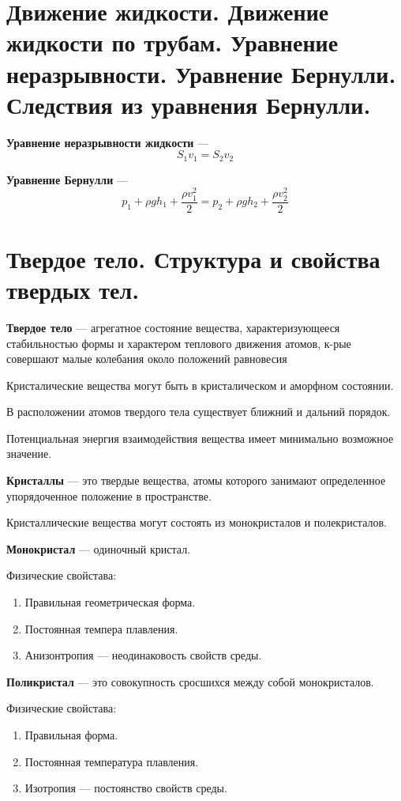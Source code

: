 \documentclass{report}
\begin{document}
\part{Движение жидкости. 
Движение жидкости по трубам. 
Уравнение неразрывности. 
Уравнение Бернулли. 
Следствия из уравнения Бернулли.}

{\bf Уравнение неразрывности жидкости} ---
$$
S_1v_1=S_2v_2
$$

{\bf Уравнение Бернулли} ---
$$
p_1+\rho gh_1+\frac{\rho v_1^2}{2}=p_2+\rho gh_2+\frac{\rho v_2^2}{2}
$$

\part{Твердое тело. 
Структура и свойства твердых тел.}

{\bf Твердое тело} ---
агрегатное состояние вещества, характеризующееся стабильностью формы и характером 
теплового движения атомов, к-рые совершают малые колебания около положений равновесия

Кристалические вещества могут быть в кристалическом и аморфном состоянии.

В расположении атомов твердого тела существует ближний и дальний порядок.

Потенциальная энергия взаимодействия вещества имеет минимально возможное значение.

{\bf Кристаллы} ---
это твердые вещества, атомы которого занимают определенное упорядоченное положение в пространстве.

Кристаллические вещества могут состоять из монокристалов и полекристалов.

{\bf Монокристал} ---
одиночный кристал.

Физические свойстава:
\begin{enumerate}
  \item Правильная геометрическая форма.
  \item Постоянная темпера плавления.
  \item Анизонтропия --- неодинаковость свойств среды. 
\end{enumerate}

{\bf Поликристал} ---
это совокупность сросшихся между собой монокристалов.

Физические свойстава:
\begin{enumerate}
  \item Правильная форма.
  \item Постоянная температура плавления.
  \item Изотропия --- постоянство свойств среды.
\end{enumerate}
\end{document}
